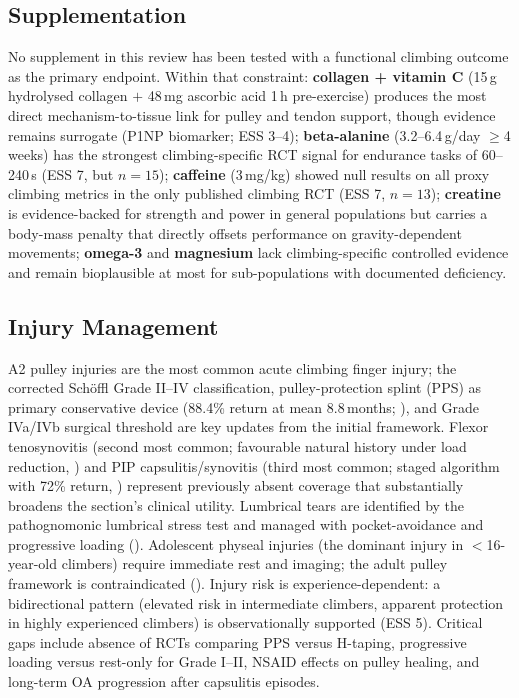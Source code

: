 \subsection*{Supplementation}

No supplement in this review has been tested with a functional climbing outcome as the primary endpoint. Within that constraint: \textbf{collagen + vitamin C} (15\,g hydrolysed collagen $+$ 48\,mg ascorbic acid 1\,h pre-exercise) produces the most direct mechanism-to-tissue link for pulley and tendon support, though evidence remains surrogate (P1NP biomarker; ESS 3--4); \textbf{beta-alanine} (3.2--6.4\,g/day $\geq$4 weeks) has the strongest climbing-specific RCT signal for endurance tasks of 60--240\,s \cite{SNWK21} (ESS 7, but $n=15$); \textbf{caffeine} (3\,mg/kg) showed null results on all proxy climbing metrics in the only published climbing RCT \cite{RLMAMR+26} (ESS 7, $n=13$); \textbf{creatine} is evidence-backed for strength and power in general populations but carries a body-mass penalty that directly offsets performance on gravity-dependent movements; \textbf{omega-3} and \textbf{magnesium} lack climbing-specific controlled evidence and remain bioplausible at most for sub-populations with documented deficiency.

\subsection*{Injury Management}

A2 pulley injuries are the most common acute climbing finger injury; the corrected Sch\"{o}ffl Grade II--IV classification, pulley-protection splint (PPS) as primary conservative device (88.4\% return at mean 8.8\,months; \cite{SS16}), and Grade IVa/IVb surgical threshold are key updates from the initial framework. Flexor tenosynovitis (second most common; favourable natural history under load reduction, \cite{MSM+22}) and PIP capsulitis/synovitis (third most common; staged algorithm with 72\% return, \cite{SLL+25}) represent previously absent coverage that substantially broadens the section's clinical utility. Lumbrical tears are identified by the pathognomonic lumbrical stress test and managed with pocket-avoidance and progressive loading (\cite{LSS+18}). Adolescent physeal injuries (the dominant injury in $<$16-year-old climbers) require immediate rest and imaging; the adult pulley framework is contraindicated (\cite{SSF+21}). Injury risk is experience-dependent: a bidirectional pattern (elevated risk in intermediate climbers, apparent protection in highly experienced climbers) is observationally supported \cite{SGJ23} (ESS 5). Critical gaps include absence of RCTs comparing PPS versus H-taping, progressive loading versus rest-only for Grade I--II, NSAID effects on pulley healing, and long-term OA progression after capsulitis episodes.

